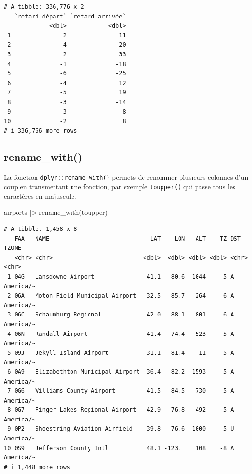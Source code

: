 \documentclass[
  letterpaper,
  DIV=11,
  numbers=noendperiod,
  oneside]{scrreprt}
\newenvironment{Shaded}{\begin{snugshade}}{\end{snugshade}}
\newcommand{\FunctionTok}[1]{\textcolor[rgb]{0.28,0.35,0.67}{#1}}
\newcommand{\NormalTok}[1]{\textcolor[rgb]{0.00,0.23,0.31}{#1}}
\newcommand{\SpecialCharTok}[1]{\textcolor[rgb]{0.37,0.37,0.37}{#1}}
\begin{document}
\begin{verbatim}
# A tibble: 336,776 x 2
   `retard départ` `retard arrivée`
             <dbl>            <dbl>
 1               2               11
 2               4               20
 3               2               33
 4              -1              -18
 5              -6              -25
 6              -4               12
 7              -5               19
 8              -3              -14
 9              -3               -8
10              -2                8
# i 336,766 more rows
\end{verbatim}

\hypertarget{rename_with}{%
\subsection{rename\_with()}\label{rename_with}}

La fonction \texttt{dplyr::rename\_with()} permets de renommer plusieurs
colonnes d'un coup en transmettant une fonction, par exemple
\texttt{toupper()} qui passe tous les caractères en majuscule.

\begin{Shaded}
\begin{Highlighting}[]
\NormalTok{airports }\SpecialCharTok{|\textgreater{}} 
  \FunctionTok{rename\_with}\NormalTok{(toupper)}
\end{Highlighting}
\end{Shaded}

\begin{verbatim}
# A tibble: 1,458 x 8
   FAA   NAME                             LAT    LON   ALT    TZ DST   TZONE    
   <chr> <chr>                          <dbl>  <dbl> <dbl> <dbl> <chr> <chr>    
 1 04G   Lansdowne Airport               41.1  -80.6  1044    -5 A     America/~
 2 06A   Moton Field Municipal Airport   32.5  -85.7   264    -6 A     America/~
 3 06C   Schaumburg Regional             42.0  -88.1   801    -6 A     America/~
 4 06N   Randall Airport                 41.4  -74.4   523    -5 A     America/~
 5 09J   Jekyll Island Airport           31.1  -81.4    11    -5 A     America/~
 6 0A9   Elizabethton Municipal Airport  36.4  -82.2  1593    -5 A     America/~
 7 0G6   Williams County Airport         41.5  -84.5   730    -5 A     America/~
 8 0G7   Finger Lakes Regional Airport   42.9  -76.8   492    -5 A     America/~
 9 0P2   Shoestring Aviation Airfield    39.8  -76.6  1000    -5 U     America/~
10 0S9   Jefferson County Intl           48.1 -123.    108    -8 A     America/~
# i 1,448 more rows
\end{verbatim}
\end{document}

